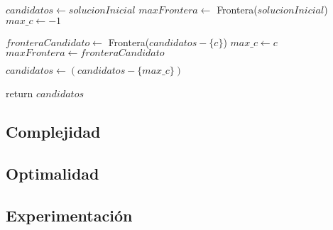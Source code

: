 \begin{algorithm}[H]
\begin{algorithmic}
    \State $candidatos \gets solucionInicial$
    \State $maxFrontera \gets$ Frontera($solucionInicial$)
    \State $max\_c \gets -1$

    \For{$c \in [0..|candidatos|)$}
            \State $fronteraCandidato \gets$ Frontera($candidatos - \{c\}$)
                \State $max\_c \gets c$
                \State $maxFrontera \gets fronteraCandidato$ \\
            \EndIf
        \EndIf
    \EndFor

        \State $candidatos \gets (candidatos - \{max\_c\})$
    \EndIf

    \State return $candidatos$

\EndFunction
\end{algorithmic}
\end{algorithm}








\begin{algorithm}[H]
\begin{algorithmic}
\EndFunction
\end{algorithmic}
\end{algorithm}


\subsection{Complejidad}

\subsection{Optimalidad}

\subsection{Experimentación}